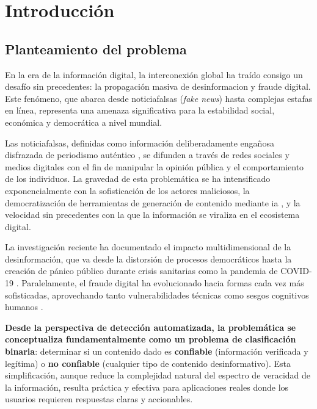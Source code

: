 \chapter{Introducción \label{cap:Introduccion}}

\section{Planteamiento del problema}

En la era de la información digital, la interconexión global ha traído consigo un desafío sin precedentes: la propagación masiva de \gls{desinformacion} y fraude digital. Este fenómeno, que abarca desde \glspl{noticiafalsa} (\textit{fake news}) hasta complejas estafas en línea, representa una amenaza significativa para la estabilidad social, económica y democrática a nivel mundial.

Las \glspl{noticiafalsa}, definidas como información deliberadamente engañosa disfrazada de periodismo auténtico \cite{bondielli2019survey}, se difunden a través de redes sociales y medios digitales con el fin de manipular la opinión pública y el comportamiento de los individuos. La gravedad de esta problemática se ha intensificado exponencialmente con la sofisticación de los actores maliciosos, la democratización de herramientas de generación de contenido mediante \gls{ia} \cite{hu2024bad}, y la velocidad sin precedentes con la que la información se viraliza en el ecosistema digital.

La investigación reciente ha documentado el impacto multidimensional de la desinformación, que va desde la distorsión de procesos democráticos \cite{ali2020posttruth} hasta la creación de pánico público durante crisis sanitarias como la pandemia de COVID-19 \cite{perez2020fake}. Paralelamente, el fraude digital ha evolucionado hacia formas cada vez más sofisticadas, aprovechando tanto vulnerabilidades técnicas como sesgos cognitivos humanos \cite{ali2021fake}.

\textbf{Desde la perspectiva de detección automatizada, la problemática se conceptualiza fundamentalmente como un problema de clasificación binaria}: determinar si un contenido dado es \textbf{confiable} (información verificada y legítima) o \textbf{no confiable} (cualquier tipo de contenido desinformativo). Esta simplificación, aunque reduce la complejidad natural del espectro de veracidad de la información, resulta práctica y efectiva para aplicaciones reales donde los usuarios requieren respuestas claras y accionables.

